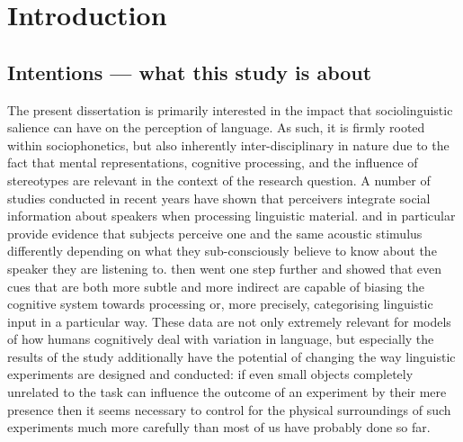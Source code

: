 \chapter{Introduction}
\label{ch.intro}

\section{Intentions --- what this study is about}
\label{sec.intro.intent}

The present dissertation is primarily interested in the impact that sociolinguistic salience can have on the perception of language.
As such, it is firmly rooted within sociophonetics, but also inherently inter-disciplinary in nature due to the fact that mental representations, cognitive processing, and the influence of stereotypes are relevant in the context of the research question.
A number of studies conducted in recent years have shown that perceivers integrate social information about speakers when processing linguistic material.
\textcite{niedzielski1999} and \textcite{hayetal2006a} in particular provide evidence that subjects perceive one and the same acoustic stimulus differently depending on what they sub-consciously believe to know about the speaker they are listening to.
\textcite{haydrager2010} then went one step further and showed that even cues that are both more subtle and more indirect are capable of biasing the cognitive system towards processing or, more precisely, categorising linguistic input in a particular way.
These data are not only extremely relevant for models of how humans cognitively deal with variation in language, but especially the results of the \citeyear{haydrager2010} study additionally have the potential of changing the way linguistic experiments are designed and conducted: if even small objects completely unrelated to the task can influence the outcome of an experiment by their mere presence then it seems necessary to control for the physical surroundings of such experiments much more carefully than most of us have probably done so far.


